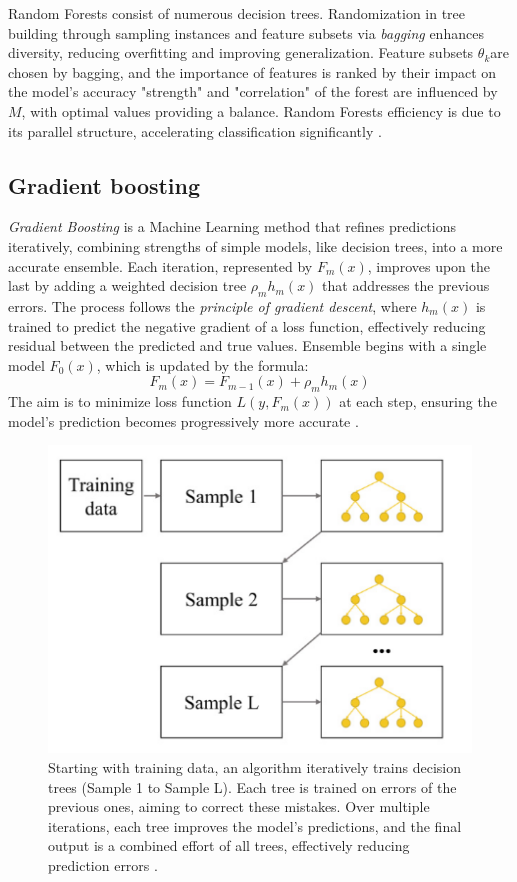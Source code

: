             Random Forests consist of numerous decision trees. Randomization in tree building through sampling instances and feature subsets via \textit{bagging} enhances diversity, reducing overfitting and improving generalization. Feature subsets $\theta_k$​ are chosen by bagging, and the importance of features is ranked by their impact on the model's accuracy "strength" and "correlation" of the forest are influenced by $M$, with optimal values providing a balance. Random Forests efficiency is due to its parallel structure, accelerating classification significantly \cite{parmar_review_2019}.
            
        \subsection{Gradient boosting}
            \textit{Gradient Boosting} is a Machine Learning method that refines predictions iteratively, combining strengths of simple models, like decision trees, into a more accurate ensemble. Each iteration, represented by $F_m(x)$, improves upon the last by adding a weighted decision tree $\rho_m h_m(x)$ that addresses the previous errors. The process follows the \textit{principle of gradient descent}, where $h_m(x)$ is trained to predict the negative gradient of a loss function, effectively reducing residual between the predicted and true values. Ensemble begins with a single model $F_0(x)$, which is updated by the formula:
            \begin{equation}
                F_m(x) = F_{m-1}(x) + \rho_m h_m(x)
            \end{equation}
            The aim is to minimize loss function $L(y, F_m(x))$ at each step, ensuring the model's prediction becomes progressively more accurate \cite{bentejac_comparative_2021}.
            \begin{figure}[H]
                \centering
                \includegraphics[width=.5\textwidth]{../src/resources/images/models/boosting.png}
                \caption{
                    Starting with training data, an algorithm iteratively trains decision trees (Sample 1 to Sample L). Each tree is trained on errors of the previous ones, aiming to correct these mistakes. Over multiple iterations, each tree improves the model's predictions, and the final output is a combined effort of all trees, effectively reducing prediction errors \cite{cha_comparison_2021}.
                }
                \label{fig:gradient_boosting}
            \end{figure}


